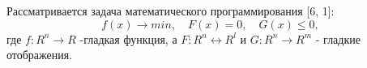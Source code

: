 \documentclass[12pt,a4paper]{article}
\begin{document}
	Рассматривается задача математического программирования [6, 1]:
	\begin{equation}\label{eq:0}
		f(x) \longrightarrow min, \quad F(x) = 0,\quad G(x) \leq 0,
	\end{equation}
где $f:R^n \longrightarrow R$ -гладкая функция, а $F:R^n \longleftrightarrow R^l$ и $G:R^n \longrightarrow R^m$ - гладкие отображения.
\end{document}
